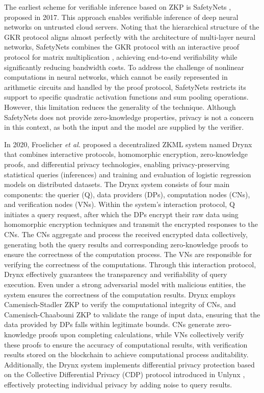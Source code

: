 \documentclass[journal]{IEEEtran}
\begin{document}
The earliest scheme for verifiable inference based on ZKP is SafetyNets \cite{ghodsi2017safetynets}, proposed in 2017. This approach enables verifiable inference of deep neural networks on untrusted cloud servers. Noting  that the hierarchical structure of the GKR protocol aligns almost perfectly with the architecture of multi-layer neural networks, SafetyNets combines the GKR protocol with an interactive proof protocol for matrix multiplication \cite{cormode2011verifying}, achieving end-to-end verifiability while significantly reducing bandwidth costs. To address the challenge of nonlinear computations in neural networks, which cannot be easily represented in arithmetic circuits and handled by the proof protocol, SafetyNets restricts its support to specific quadratic activation functions and sum pooling operations. However, this limitation reduces the generality of the technique. Although SafetyNets does not provide zero-knowledge properties, privacy is not a concern in this context, as both the input and the model are supplied by the verifier.

In 2020, Froelicher \emph{et al.} \cite{froelicher2020drynx} proposed a decentralized ZKML system named Drynx that combines interactive protocols, homomorphic encryption, zero-knowledge proofs, and differential privacy technologies, enabling privacy-preserving statistical queries (inferences) and training and evaluation of logistic regression models on distributed datasets. The Drynx system consists of four main components: the querier (Q), data providers (DPs), computation nodes (CNs), and verification nodes (VNs). Within the system's interaction protocol, Q initiates a query request, after which the DPs encrypt their raw data using homomorphic encryption techniques and transmit the encrypted responses to the CNs. The CNs aggregate and process the received encrypted data collectively, generating both the query results and corresponding zero-knowledge proofs to ensure the correctness of the computation process. The VNs are responsible for verifying the correctness of the computations. Through this interaction protocol, Drynx effectively guarantees the transparency and verifiability of query execution. Even under a strong adversarial model with malicious entities, the system ensures the correctness of the computation results. Drynx employs Camenisch-Stadler ZKP \cite{camenisch1997proof} to verify the computational integrity of CNs, and Camenisch-Chaabouni ZKP \cite{chaabouni2007efficient} to validate the range of input data, ensuring that the data provided by DPs falls within legitimate bounds. CNs generate zero-knowledge proofs upon completing calculations, while VNs collectively verify these proofs to ensure the accuracy of computational results, with verification results stored on the blockchain to achieve computational process auditability. Additionally, the Drynx system implements differential privacy protection based on the Collective Differential Privacy (CDP) protocol introduced in Unlynx \cite{froelicher2017unlynx}, effectively protecting individual privacy by adding noise to query results.
\end{document}
